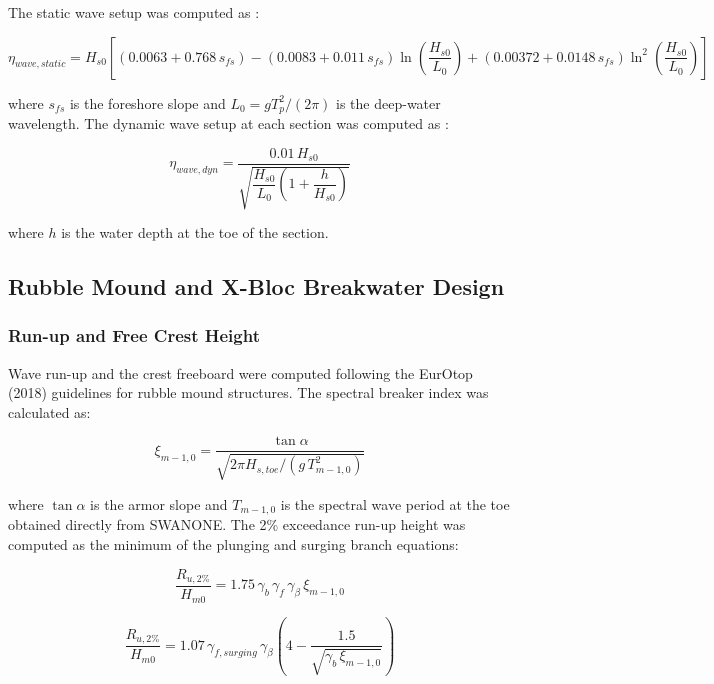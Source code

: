 \documentclass[a4paper, 11pt]{article}
\begin{document}
The static wave setup was computed as \cite{CE593}:

\begin{equation}
    \eta_{wave,static} = H_{s0} \left[ 
    (0.0063 + 0.768\,s_{fs}) 
    - (0.0083 + 0.011\,s_{fs})\ln\!\left(\frac{H_{s0}}{L_0}\right)
    + (0.00372 + 0.0148\,s_{fs})
    \ln^2\!\left(\frac{H_{s0}}{L_0}\right) \right]
\end{equation}

where $s_{fs}$ is the foreshore slope and $L_0 = gT_p^2/(2\pi)$ is 
the deep-water wavelength. The dynamic wave setup at each section 
was computed as \cite{CE593}:

\begin{equation}
    \eta_{wave,dyn} = \frac{0.01\,H_{s0}}
    {\sqrt{\dfrac{H_{s0}}{L_0}\left(1 + \dfrac{h}{H_{s0}}\right)}}
\end{equation}

where $h$ is the water depth at the toe of the section.
\subsection{Rubble Mound and X-Bloc Breakwater Design}

\subsubsection{Run-up and Free Crest Height}
\label{sec:runup}
\hspace{0.5cm}Wave run-up and the crest freeboard were 
computed following the EurOtop (2018) guidelines for rubble mound 
structures. The spectral breaker index was calculated as:

\begin{equation}
    \xi_{m-1,0} = \frac{\tan\alpha}{\sqrt{2\pi H_{s,toe} / 
    (g\,T_{m-1,0}^2)}}
\end{equation}

where $\tan\alpha$ is the armor slope and $T_{m-1,0}$ is the 
spectral wave period at the toe obtained directly from SWANONE. 
The 2\% exceedance run-up height was computed as the minimum of 
the plunging and surging branch equations:

\begin{equation}
    \frac{R_{u,2\%}}{H_{m0}} = 
    1.75\,\gamma_b\,\gamma_f\,\gamma_\beta\,\xi_{m-1,0}
\end{equation}

\begin{equation}
    \frac{R_{u,2\%}}{H_{m0}} = 
    1.07\,\gamma_{f,surging}\,\gamma_\beta
    \left(4 - \frac{1.5}{\sqrt{\gamma_b\,\xi_{m-1,0}}}\right)
\end{equation}
\end{document}

